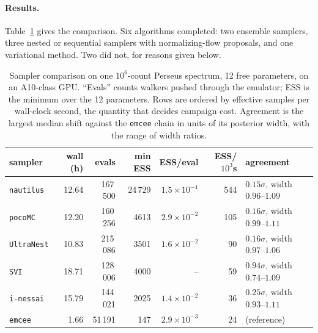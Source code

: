 \documentclass[11pt,a4paper]{article}
\newcommand{\code}[1]{\texttt{#1}}
\begin{document}
\paragraph{Results.} Table~\ref{tab:bakeoff} gives the comparison. Six
algorithms completed: two ensemble samplers, three nested or
sequential samplers with normalizing-flow proposals, and one variational
method. Two did not, for reasons given below.

\begin{table}[t]
\centering
\caption{Sampler comparison on one $10^{6}$-count Perseus spectrum, 12 free
parameters, on an A10-class GPU. ``Evals'' counts walkers pushed through the
emulator; ESS is the minimum over the 12 parameters. Rows are ordered by
effective samples per wall-clock second, the quantity that decides campaign
cost. Agreement is the largest median shift against the \code{emcee} chain in
units of its posterior width, with the range of width ratios.}
\label{tab:bakeoff}
\begin{tabular}{lrrrrrl}
\toprule
sampler & wall (h) & evals & min ESS & ESS/eval & ESS/$10^{3}$s & agreement \\
\midrule
\code{nautilus}  & 12.64 & 167\,500 & 24\,729\rlap{$^{*}$} & $1.5\times10^{-1}$ & 544 & $0.15\sigma$, width $0.96$--$1.09$ \\
\code{pocoMC}    & 12.20 & 160\,256 &  4613\rlap{$^{*}$} & $2.9\times10^{-2}$ & 105 & $0.16\sigma$, width $0.99$--$1.11$ \\
\code{UltraNest} & 10.83 & 215\,086 &  3501 & $1.6\times10^{-2}$ &  90 & $0.16\sigma$, width $0.97$--$1.06$ \\
\code{SVI}       & 18.71 & 128\,006 &  4000\rlap{$^\dagger$} & --\rlap{$^\dagger$} &  59\rlap{$^\dagger$} & $0.94\sigma$, width $0.74$--$1.09$ \\
\code{i-nessai}  & 15.79 & 144\,021 &  2025\rlap{$^{*}$} & $1.4\times10^{-2}$ &  36 & $0.25\sigma$, width $0.93$--$1.11$ \\
\code{emcee}     &  1.66 &  51\,191 &   147 & $2.9\times10^{-3}$ &  24 & (reference) \\
\bottomrule
\end{tabular}
\end{table}
\end{document}

